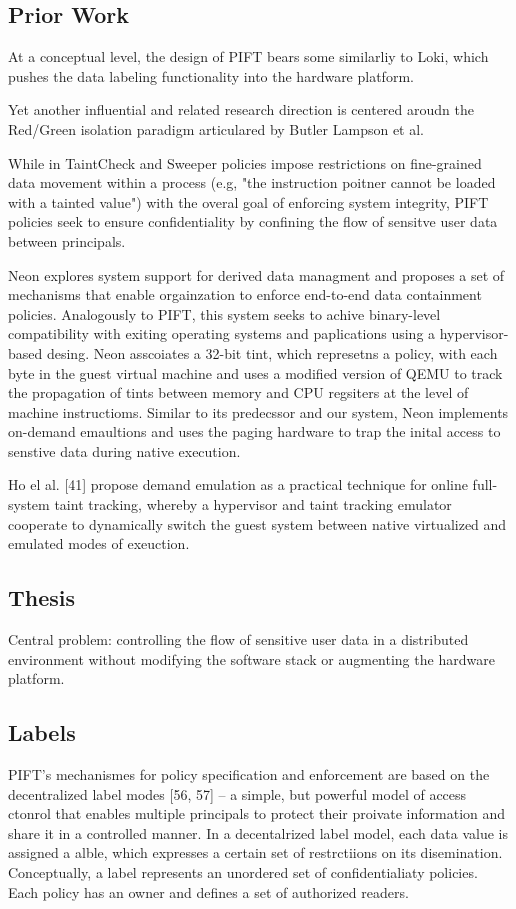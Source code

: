 \subsection{Prior Work}
At a conceptual level, the design of PIFT bears some similarliy to Loki, which
pushes the data labeling functionality into the hardware platform.

Yet another influential and related research direction is centered aroudn the
Red/Green isolation paradigm articulared by Butler Lampson et al.

While in TaintCheck and Sweeper policies impose restrictions on fine-grained
data movement within a process (e.g, "the instruction poitner cannot be loaded
with a tainted value") with the overal goal of enforcing system
integrity, PIFT policies seek to ensure confidentiality by confining the flow
of sensitve user data between principals.

Neon explores system support for derived data managment and proposes a set of
mechanisms that enable orgainzation to enforce end-to-end data containment
policies.  Analogously to PIFT, this system seeks to achive binary-level
compatibility with exiting operating systems and paplications using a
hypervisor-based desing.  Neon asscoiates a 32-bit tint, which represetns a
policy, with each byte in the guest virtual machine and uses a modified version
of QEMU to track the propagation of tints between memory and CPU regsiters at
the level of machine instructioms.  Similar to its predecssor and our system,
Neon implements on-demand emaultions and uses the paging hardware to trap
the inital access to senstive data during native execution.

Ho el al. [41] propose demand emulation as a practical technique for online
full-system taint tracking, whereby a hypervisor and taint tracking emulator
cooperate to dynamically switch the guest system between native virtualized and
emulated modes of exeuction.


\subsection{Thesis}
Central problem: controlling the flow of sensitive user data in a distributed
environment without modifying the software stack or augmenting the hardware
platform.


\subsection{Labels}
PIFT's mechanismes for policy specification and enforcement are based on the
decentralized label modes [56, 57] -- a simple, but powerful model of access
ctonrol that enables multiple principals to protect their proivate information
and share it in a controlled manner.  In a decentalrized label model, each data
value is assigned a alble, which expresses a certain set of restrctiions on its
disemination.  Conceptually, a label represents an unordered set of
confidentialiaty policies.  Each policy has an owner and defines a set of
authorized readers.  


